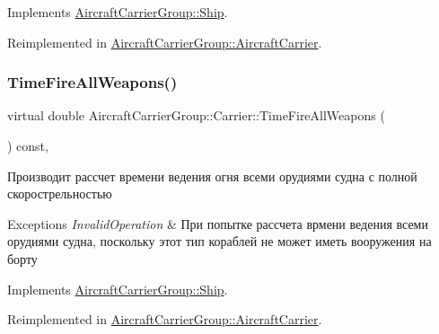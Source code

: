 Implements \mbox{\hyperlink{class_aircraft_carrier_group_1_1_ship_a8ac6e8e9ed4f997a5f02fda7e049cd6d}{Aircraft\+Carrier\+Group\+::\+Ship}}.



Reimplemented in \mbox{\hyperlink{class_aircraft_carrier_group_1_1_aircraft_carrier_aa7839178084e4f749592e02d2d8e93a4}{Aircraft\+Carrier\+Group\+::\+Aircraft\+Carrier}}.

\mbox{\label{class_aircraft_carrier_group_1_1_carrier_aa0e7ab8690d5120c39b5eb1bb58d5709}} 
\subsubsection{\texorpdfstring{Time\+Fire\+All\+Weapons()}{TimeFireAllWeapons()}}
{\footnotesize\ttfamily virtual double Aircraft\+Carrier\+Group\+::\+Carrier\+::\+Time\+Fire\+All\+Weapons (\begin{DoxyParamCaption}{ }\end{DoxyParamCaption}) const\hspace{0.3cm}{\ttfamily [inline]}, {\ttfamily [virtual]}}



Производит рассчет времени ведения огня всеми орудиями судна с полной скорострельностью 


\begin{DoxyExceptions}{Exceptions}
{\em Invalid\+Operation} & При попытке рассчета врмени ведения всеми орудиями судна, поскольку этот тип кораблей не может иметь вооружения на борту \\
\hline
\end{DoxyExceptions}


Implements \mbox{\hyperlink{class_aircraft_carrier_group_1_1_ship_a255221ad52eec6bd027854b1fdb18187}{Aircraft\+Carrier\+Group\+::\+Ship}}.



Reimplemented in \mbox{\hyperlink{class_aircraft_carrier_group_1_1_aircraft_carrier_a6613d24d38f7a28d20f35437bc069f98}{Aircraft\+Carrier\+Group\+::\+Aircraft\+Carrier}}.

\mbox{\label{class_aircraft_carrier_group_1_1_carrier_a1ed41e4f12ea2941112fa17adf8eb7a0}} 
